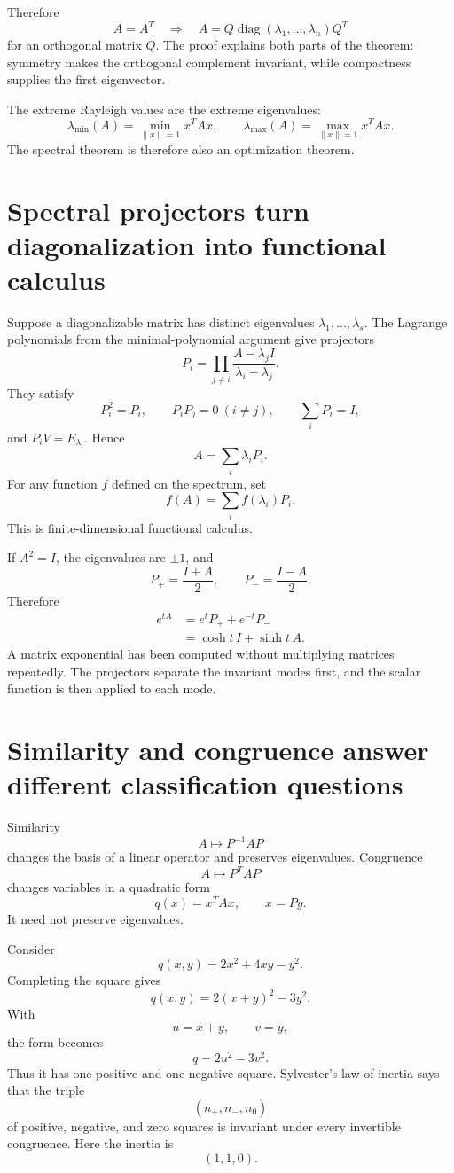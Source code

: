 Therefore
\[
  \boxed{
  A=A^T
  \quad\Longrightarrow\quad
  A=Q\operatorname{diag}(\lambda_1,\ldots,\lambda_n)Q^T}
\]
for an orthogonal matrix \(Q\).  The proof explains both parts of the theorem: symmetry makes the orthogonal complement invariant, while compactness supplies the first eigenvector.

The extreme Rayleigh values are the extreme eigenvalues:
\[
  \lambda_{\min}(A)
  =\min_{\|x\|=1}x^TAx,
  \qquad
  \lambda_{\max}(A)
  =\max_{\|x\|=1}x^TAx.
\]
The spectral theorem is therefore also an optimization theorem.

\section{Spectral projectors turn diagonalization into functional calculus}

Suppose a diagonalizable matrix has distinct eigenvalues \(\lambda_1,\ldots,\lambda_s\).  The Lagrange polynomials from the minimal-polynomial argument give projectors
\[
  P_i=
  \prod_{j\ne i}
  \frac{A-\lambda_jI}{\lambda_i-\lambda_j}.
\]
They satisfy
\[
  P_i^2=P_i,
  \qquad
  P_iP_j=0\ (i\ne j),
  \qquad
  \sum_iP_i=I,
\]
and \(P_iV=E_{\lambda_i}\).  Hence
\[
  A=\sum_i\lambda_iP_i.
\]
For any function \(f\) defined on the spectrum, set
\[
  f(A)=\sum_i f(\lambda_i)P_i.
\]
This is finite-dimensional functional calculus.

If \(A^2=I\), the eigenvalues are \(\pm1\), and
\[
  P_+=\frac{I+A}{2},
  \qquad
  P_-=\frac{I-A}{2}.
\]
Therefore
\[
\begin{aligned}
  e^{tA}
  &=e^tP_++e^{-t}P_-\\
  &=\cosh t\,I+\sinh t\,A.
\end{aligned}
\]
A matrix exponential has been computed without multiplying matrices repeatedly.  The projectors separate the invariant modes first, and the scalar function is then applied to each mode.

\section{Similarity and congruence answer different classification questions}

Similarity
\[
  A\longmapsto P^{-1}AP
\]
changes the basis of a linear operator and preserves eigenvalues.  Congruence
\[
  A\longmapsto P^TAP
\]
changes variables in a quadratic form
\[
  q(x)=x^TAx,
  \qquad x=Py.
\]
It need not preserve eigenvalues.

Consider
\[
  q(x,y)=2x^2+4xy-y^2.
\]
Completing the square gives
\[
  q(x,y)=2(x+y)^2-3y^2.
\]
With
\[
  u=x+y,
  \qquad v=y,
\]
the form becomes
\[
  q=2u^2-3v^2.
\]
Thus it has one positive and one negative square.  Sylvester's law of inertia says that the triple
\[
  (n_+,n_-,n_0)
\]
of positive, negative, and zero squares is invariant under every invertible congruence.  Here the inertia is
\[
  (1,1,0).
\]

